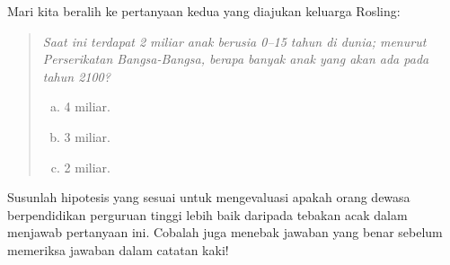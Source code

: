 \begin{exercisewrap}
\begin{nexercise}\label{roslingB_hypothesis_setup}%
Mari kita beralih ke pertanyaan kedua yang diajukan keluarga Rosling:
\begin{quote}{\em
  Saat ini terdapat 2 miliar anak berusia
  0--15 tahun di dunia; menurut Perserikatan Bangsa-Bangsa,
  berapa banyak anak yang akan ada pada tahun 2100?
  \begin{enumerate}[a.]
  \setlength{\itemsep}{0mm}
  \item 4 miliar.
  \item 3 miliar.
  \item 2 miliar.
  \end{enumerate}
}\end{quote}
Susunlah hipotesis yang sesuai untuk mengevaluasi apakah
orang dewasa berpendidikan perguruan tinggi lebih baik daripada tebakan acak
dalam menjawab pertanyaan ini.
Cobalah juga menebak jawaban yang benar sebelum memeriksa
jawaban dalam catatan kaki!\footnotemark
\end{nexercise}
\end{exercisewrap}

\newcommand{\roslingBsize}{228}
\newcommand{\roslingBprop}{0.149}
\newcommand{\roslingBpropcomplement}{0.851}
\newcommand{\roslingBpercent}{14.9\%}
\newcommand{\roslingBpercentcomplement}{85.1\%}
\newcommand{\roslingBcount}{34}
\newcommand{\roslingBcountcomplement}{194}
\newcommand{\roslingBse}{0.024}

